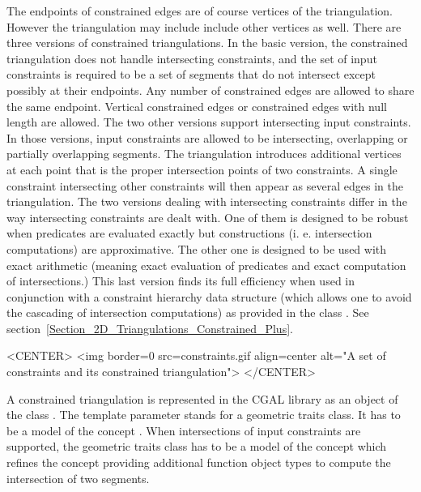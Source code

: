 The endpoints of constrained edges are of course vertices of the
triangulation. However the triangulation may include
include other vertices as well.
There are three versions of  constrained triangulations.
In the basic version, the constrained triangulation 
does not handle intersecting constraints, and the set of input 
constraints is required to be a set of segments that do not intersect
except possibly at their endpoints. Any number of constrained edges
are allowed to share the same endpoint.  Vertical constrained edges or
constrained edges with null length are allowed.
The two other versions support intersecting input constraints.
In those versions, input constraints are allowed to be
intersecting, overlapping or partially
overlapping segments.
The triangulation introduces  additional  vertices at each point that
is the proper intersection points of  two 
constraints. A single constraint intersecting other
constraints will then appear as several edges in the triangulation.
The two versions dealing with intersecting constraints differ
in the way intersecting constraints are dealt with. One of them is
designed to be robust when predicates are evaluated exactly but
constructions (i. e.  intersection computations) are
approximative.
The other one is designed to be used 
with exact arithmetic (meaning exact
evaluation of predicates and exact computation of intersections.)
This last version finds its full efficiency  when used in conjunction
with a constraint hierarchy data structure (which allows one to avoid the
cascading of intersection computations)
as provided in the class
. See section~\ref{Section_2D_Triangulations_Constrained_Plus}.

\begin{ccTexOnly}
\begin{center}   \end{center}
\end{ccTexOnly}
 
\begin{ccHtmlOnly}
<CENTER>
<img border=0 src=constraints.gif align=center alt="A set of
constraints and its constrained triangulation">
</CENTER>
\end{ccHtmlOnly}

A constrained triangulation is represented in the CGAL library as an
object of the class .
The template parameter  
stands for a geometric traits class. It has to be a model
of the concept .
When intersections of input constraints are supported, 
the geometric traits class has to be a model 
of the concept 
which refines the concept 
providing  additional function object types
to compute the intersection of two segments.

